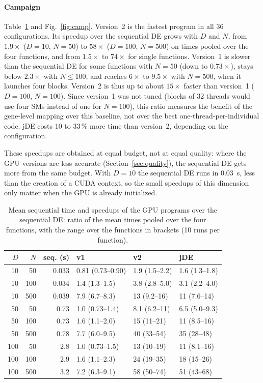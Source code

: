 \documentclass[conference]{IEEEtran}
\begin{document}
\paragraph{Campaign} Table~\ref{tab:camp} and Fig.~\ref{fig:camp}. Version~2 is the fastest
program in all 36 configurations. Its speedup over the sequential DE grows with $D$ and $N$,
from $1.9\times$ ($D=10$, $N=50$) to $58\times$ ($D=100$, $N=500$) on times pooled over the four
functions, and from $1.5\times$ to $74\times$ for single functions. Version~1 is slower than the
sequential DE for some functions with $N=50$ (down to $0.73\times$), stays below $2.3\times$ with
$N\le100$, and reaches $6\times$ to $9.5\times$ with $N=500$, when it launches four blocks. Version~2 is thus up
to about $15\times$ faster than version~1 ($D=100$, $N=100$). Since version~1 was not tuned
(blocks of 32 threads would use four SMs instead of one for $N=100$), this ratio measures the
benefit of the gene-level mapping over this baseline, not over the best one-thread-per-individual
code. jDE costs 10 to 33\,\% more time than version~2, depending on the configuration.

These speedups are obtained at equal budget, not at equal quality: where the GPU versions are
less accurate (Section~\ref{sec:quality}), the sequential DE gets more from the same budget.
With $D=10$ the sequential DE runs in 0.03~s, less than the creation of a CUDA context, so the
small speedups of this dimension only matter when the GPU is already initialized.

\begin{table}[!t]
\centering
\caption{Mean sequential time and speedups of the GPU programs over the sequential DE:
ratio of the mean times pooled over the four functions, with the range over the functions in
brackets (10 runs per function).}
\label{tab:camp}
\footnotesize\setlength{\tabcolsep}{3pt}
\begin{tabular}{rrrlll}
\toprule
$D$ & $N$ & seq. (s) & v1 & v2 & jDE\\
\midrule
10 & 50 & 0.033 & 0.81 (0.73--0.90) & 1.9 (1.5--2.2) & 1.6 (1.3--1.8)\\
10 & 100 & 0.034 & 1.4 (1.3--1.5) & 3.8 (2.8--5.0) & 3.1 (2.2--4.0)\\
10 & 500 & 0.039 & 7.9 (6.7--8.3) & 13 (9.2--16) & 11 (7.6--14)\\
50 & 50 & 0.73 & 1.0 (0.73--1.4) & 8.1 (6.2--11) & 6.5 (5.0--9.3)\\
50 & 100 & 0.73 & 1.6 (1.1--2.0) & 15 (11--21) & 11 (8.5--16)\\
50 & 500 & 0.78 & 7.7 (6.0--9.5) & 40 (33--54) & 35 (28--48)\\
100 & 50 & 2.8 & 1.0 (0.73--1.5) & 13 (10--19) & 11 (8.1--16)\\
100 & 100 & 2.9 & 1.6 (1.1--2.3) & 24 (19--35) & 18 (15--26)\\
100 & 500 & 3.2 & 7.2 (6.3--9.1) & 58 (50--74) & 51 (43--68)\\
\bottomrule
\end{tabular}
\end{table}
\end{document}
